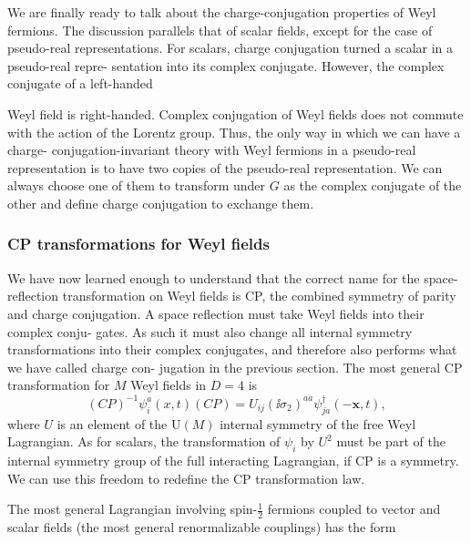 We are finally ready to talk about the charge-conjugation properties of Weyl
fermions. The discussion parallels that of scalar fields, except for the case of pseudo-real
representations. For scalars, charge conjugation turned a scalar in a pseudo-real repre-
sentation into its complex conjugate. However, the complex conjugate of a left-handed

Weyl field is right-handed. Complex conjugation of Weyl fields does not commute with
the action of the Lorentz group. Thus, the only way in which we can have a charge-
conjugation-invariant theory with Weyl fermions in a pseudo-real representation is
to have two copies of the pseudo-real representation. We can always choose one of
them to transform under $G$ as the complex conjugate of the other and define charge
conjugation to exchange them.

\subsubsection{CP transformations for Weyl fields}

We have now learned enough to understand that the correct name for the space-
reflection transformation on Weyl fields is CP, the combined symmetry of parity and
charge conjugation. A space reflection must take Weyl fields into their complex conju-
gates. As such it must also change all internal symmetry transformations into their
complex conjugates, and therefore also performs what we have called charge con-
jugation in the previous section. The most general CP transformation for $M$ Weyl
fields in $D=4$ is
\begin{equation*}
  (CP)^{-1}\psi_i^a(x,t)(CP)=U_{ij}(\ii\sigma_2)^{a\dot a}\psi_{j\dot a}^{\dagger}(-\mathbf{x},t),
\end{equation*}
where $U$ is an element of the $\mathrm{U}(M)$ internal symmetry of the free Weyl Lagrangian.
As for scalars, the transformation of $\psi_i$ by $U^2$ must be part of the internal symmetry
group of the full interacting Lagrangian, if CP is a symmetry. We can use this freedom to
redefine the CP transformation law.

The most general Lagrangian involving spin-$\frac12$ fermions coupled to vector and scalar
fields (the most general renormalizable couplings) has the form

